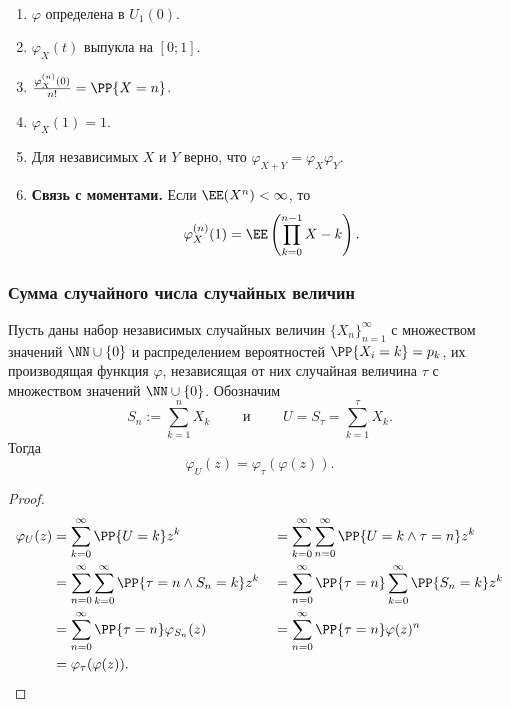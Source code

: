 \documentclass[12pt,a4paper]{article}
\begin{document}
    \begin{lemma}\ 
        \begin{enumerate}
            \item $\varphi$ определена в $U_1(0)$.
            \item $\varphi_X(t)$ выпукла на $[0; 1]$.
            \item $\frac{\varphi_X^{(n)}(0)}{n!} = \PP\{X = n\}$.
            \item $\varphi_X(1) = 1$.
            \item Для независимых $X$ и $Y$ верно, что $\varphi_{X + Y} = \varphi_X \varphi_Y$.
            \item \textbf{Связь с моментами.} Если $\EE(X^n) < \infty$, то
                \[\varphi_X^{(n)}(1) = \EE\left(\prod_{k=0}^{n-1} X - k\right).\]
        \end{enumerate}
    \end{lemma}

    \subsubsection{Сумма случайного числа случайных величин}

    \begin{theorem}
        Пусть даны набор независимых случайных величин $\{X_n\}_{n=1}^\infty$ с множеством значений $\NN \cup \{0\}$ и распределением вероятностей $\PP\{X_i = k\} = p_k$, их производящая функция $\varphi$, независящая от них случайная величина $\tau$ с множеством значений $\NN \cup \{0\}$. Обозначим
        \[S_n := \sum_{k=1}^n X_k \qquad \text{ и } \qquad U = S_\tau = \sum_{k=1}^\tau X_k.\]
        Тогда
        \[\varphi_U(z) = \varphi_\tau(\varphi(z)).\]
    \end{theorem}

    \begin{proof}
        \begin{align*}
            \varphi_U(z)
            &= \sum_{k=0}^\infty \PP\{U = k\} z^k&
            &= \sum_{k=0}^\infty \sum_{n=0}^\infty \PP\{U = k \wedge \tau = n\} z^k\\
            &= \sum_{n=0}^\infty \sum_{k=0}^\infty \PP\{\tau = n \wedge S_n = k\} z^k&
            &= \sum_{n=0}^\infty \PP\{\tau = n\} \sum_{k=0}^\infty \PP\{S_n = k\} z^k\\
            &= \sum_{n=0}^\infty \PP\{\tau = n\} \varphi_{S_n}(z)&
            &= \sum_{n=0}^\infty \PP\{\tau = n\} \varphi(z)^n\\
            &= \varphi_{\tau}(\varphi(z)).
        \end{align*}
    \end{proof}
\end{document}
